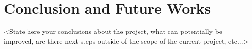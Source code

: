 \section{Conclusion and Future Works}
\label{sec:concl}
<State here your conclusions about the project, what can potentially be improved, are there next steps outside of the scope of the current project, etc...>